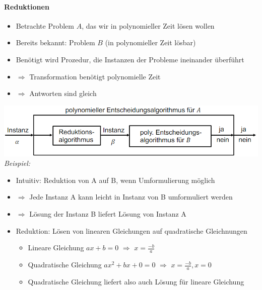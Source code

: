 \documentclass[
    ngerman,
    color=3b,
    dark_mode,
    load_common, %
    summary,
    boxarc,
]{tuda_summary}
\begin{document}
\paragraph{Reduktionen}\mbox{}
\begin{idea}[Reduktion]\mbox{}
      \begin{itemize}
            \item Betrachte Problem $A$, das wir in polynomieller Zeit lösen wollen
            \item Bereits bekannt: Problem $B$ (in polynomieller Zeit lösbar)
            \item Benötigt wird Prozedur, die Instanzen der Probleme ineinander überführt
            \item[] $\Rightarrow$ Transformation benötigt polynomielle Zeit
            \item[] $\Rightarrow$ Antworten sind gleich
      \end{itemize}
\end{idea}
\includegraphics[width=15cm]{pictures/reduktion1.PNG}\\
\textit{Beispiel:}
\begin{grayInfoBox}

      \begin{itemize}
            \item Intuitiv: Reduktion von A auf B, wenn Umformulierung möglich
            \item[] $\Rightarrow$ Jede Instanz A kann leicht in Instanz von B umformuliert werden
            \item[] $\Rightarrow$ Lösung der Instanz B liefert Lösung von Instanz A
            \item Reduktion: Lösen von linearen Gleichungen auf quadratische Gleichnungen
                  \begin{itemize}
                        \item Lineare Gleichung $ax + b = 0$ $\Rightarrow$ $x= \frac{-b}{a}$
                        \item Quadratische Gleichung $ax^2 + bx + 0 = 0$ $\Rightarrow$ $x = \frac{-b}{a}, x = 0$
                        \item Quadratische Gleichung liefert also auch Lösung für lineare Gleichung
                  \end{itemize}
      \end{itemize}
\end{grayInfoBox}
\end{document}
